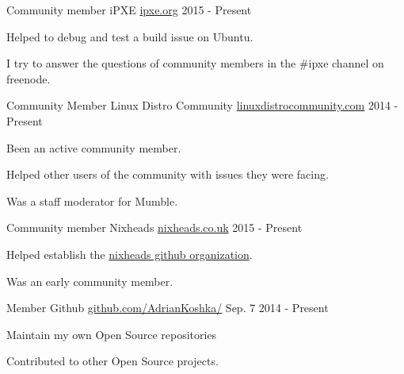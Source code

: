 \begin{cventries}

\cventry
{Community member} %
{iPXE} %
{\href{http://ipxe.org/}{ipxe.org}} %
{2015 - Present} %
{ %
\begin{cvitems}
\item {Helped to debug and test a build issue on Ubuntu.}
\item {I try to answer the questions of community members in the \#ipxe channel on freenode.}
\end{cvitems} 
}


\cventry
{Community Member} %
{Linux Distro Community} %
{\href{https://www.linuxdistrocommunity.com/}{linuxdistrocommunity.com}} %
{2014 - Present} %
{ %
\begin{cvitems}
\item {Been an active community member.}
\item {Helped other users of the community with issues they were facing.}
\item {Was a staff moderator for Mumble.} 
\end{cvitems}
}


\cventry
{Community member} %
{Nixheads} %
{\href{http://nixheads.co.uk/}{nixheads.co.uk}} %
{2015 - Present} %
{ %
\begin{cvitems}
\item {Helped establish the \href{https://github.com/nixheads}{nixheads github organization}.}
\item {Was an early community member.}
\end{cvitems}
}


\cventry
{Member} %
{Github} %
{\href{https://github.com/AdrianKoshka/}{github.com/AdrianKoshka/}} %
{Sep. 7 2014 - Present} %
{ %
\begin{cvitems}
\item {Maintain my own Open Source repositories}
\item {Contributed to other Open Source projects.}
\end{cvitems}
}


\end{cventries}
